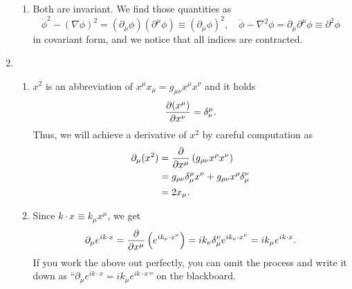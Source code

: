 \documentclass[a4paper,pdftex]{article}
\begin{document}
\begin{enumerate}
\begin{enumerate}
      \item 
      Both are invariant. We find those quantities as 
      \begin{equation}
         \dot{\phi}^2-(\nabla\phi)^2
         =
         (\partial_{\mu}\phi)(\partial^{\mu}\phi)
         \equiv
         (\partial_{\mu}\phi)^2
         ,\quad
         \ddot{\phi}-\nabla^2\phi
         =
         \partial_{\mu}\partial^{\mu}\phi
         \equiv
         \partial^2\phi
      \end{equation}
      in covariant form, and we notice that all indices are contracted.
   \end{enumerate}

   \item 
   \begin{enumerate}
      \item 
      $x^2$ is an abbreviation of $x^{\mu}x_{\mu}=g_{\mu\nu}x^{\mu}x^{\nu}$ and it holds
      \begin{equation}
         \pdv{(x^{\mu})}{x^{\nu}}
         =
         \delta^{\mu}_{\nu}
         .
      \end{equation}
      Thus, we will achieve a derivative of $x^2$ by careful computation as
      \begin{align}
         \partial_{\mu}(x^2)
         &=
         \pdv{}{x^{\mu}}
         \left(g_{\rho\nu}x^{\rho}x^{\nu}\right)
         \nonumber
         \\
         &=
         g_{\rho\nu}\delta^{\rho}_{\mu}x^{\nu}
         +
         g_{\rho\nu}x^{\rho}\delta_{\mu}^{\nu}
         \nonumber
         \\
         &=
         2x_{\mu}
         .
      \end{align}

      \item 
      Since $k\cdot x\equiv k_{\mu}x^{\mu}$, we get
      \begin{equation}
         \partial_{\mu}e^{ik\cdot x}
         =
         \pdv{}{x^{\mu}}\left(e^{ik_{\nu}\cdot x^{\nu}}\right)
         =
         ik_{\nu}\delta^{\nu}_{\mu}e^{ik_{\nu}\cdot x^{\nu}}
         =
         ik_{\mu}e^{ik\cdot x}
         .
      \end{equation}
      If you work the above out perfectly, you can omit the process and write it down as ``$\partial_{\mu}e^{ik\cdot x}=ik_{\mu}e^{ik\cdot x}$'' on the blackboard. 
   \end{enumerate}


\end{enumerate}
\end{document}
